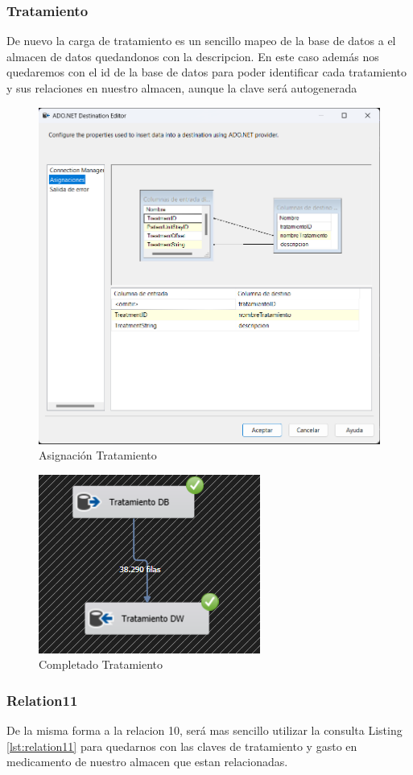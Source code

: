 \documentclass{article}
\begin{document}
	\subsubsection{Tratamiento}
	De nuevo la carga de tratamiento es un sencillo mapeo de la base de datos a el almacen de datos quedandonos con la descripcion. En este caso además nos quedaremos con el id de la base de datos para poder identificar cada tratamiento y sus relaciones en nuestro almacen, aunque la clave será autogenerada
	\begin{figure}[H]
		\centering
		\includegraphics[width=.7\linewidth]{./images/asignaciones/tratamiento.png}
		\caption{Asignación Tratamiento}
	\end{figure}
	\begin{figure}[H]
		\centering
		\includegraphics[width=.3\linewidth]{./images/completados/tratamiento.png}
		\caption{Completado Tratamiento}
	\end{figure}
	\subsubsection{Relation11}
	De la misma forma a la relacion 10, será mas sencillo utilizar la consulta Listing \ref{lst:relation11} para quedarnos con las claves de tratamiento y gasto en medicamento de nuestro almacen que estan relacionadas.
	
\end{document}
